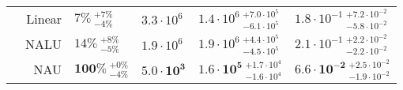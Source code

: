 \begin{table}[!h]
\begin{tabular}{crllll}
\nopagebreak
 & Linear & $7\% {~}^{+7\%}_{-4\%}$ & $3.3 \cdot 10^{6}$ & $1.4 \cdot 10^{6} {~}^{+7.0 \cdot 10^{5}}_{-6.1 \cdot 10^{5}}$ & $1.8 \cdot 10^{-1} {~}^{+7.2 \cdot 10^{-2}}_{-5.8 \cdot 10^{-2}}$\\

\nopagebreak
 & NALU & $14\% {~}^{+8\%}_{-5\%}$ & $1.9 \cdot 10^{6}$ & $1.9 \cdot 10^{6} {~}^{+4.4 \cdot 10^{5}}_{-4.5 \cdot 10^{5}}$ & $2.1 \cdot 10^{-1} {~}^{+2.2 \cdot 10^{-2}}_{-2.2 \cdot 10^{-2}}$\\

\nopagebreak
\multirow{-4}{*}{\centering\arraybackslash $\bm{-}$} & NAU & $\mathbf{100\%} {~}^{+0\%}_{-4\%}$ & $\mathbf{5.0 \cdot 10^{3}}$ & $\mathbf{1.6 \cdot 10^{5}} {~}^{+1.7 \cdot 10^{4}}_{-1.6 \cdot 10^{4}}$ & $\mathbf{6.6 \cdot 10^{-2}} {~}^{+2.5 \cdot 10^{-2}}_{-1.9 \cdot 10^{-2}}$\\
\bottomrule
\end{tabular}
\end{table}
